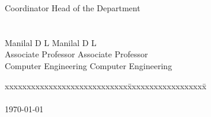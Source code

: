 \documentclass[11pt]{report}
\begin{document}
\begin{titlepage}
\begin{tabbing}
Coordinator\>\> Head of the Department
\\
\\
\\
Manilal D L \>\>Manilal D L\\
Associate Professor	\>\> Associate Professor\\
Computer Engineering	\>\>	Computer Engineering
\end{tabbing}
\vspace{.08in}
%
\begin{tabbing}
xxxxxxxxxxxxxxxxxxxxxxxxxxxx\= xxxxxxxxxxxxxxxxxx\= \kill
\\
\\
\today

\end{tabbing}

\end{titlepage}
\end{document}
